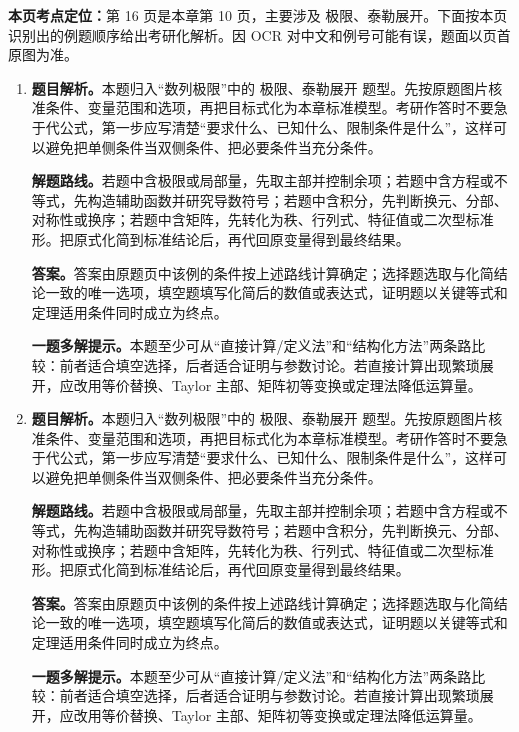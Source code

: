 \begin{solutionblock}
\textbf{本页考点定位：}第 16 页是本章第 10 页，主要涉及 极限、泰勒展开。下面按本页识别出的例题顺序给出考研化解析。因 OCR 对中文和例号可能有误，题面以页首原图为准。

\begin{enumerate}[label=\textbf{例\arabic*.}, leftmargin=2.4em]

\item \textbf{题目解析。}本题归入“数列极限”中的 极限、泰勒展开 题型。先按原题图片核准条件、变量范围和选项，再把目标式化为本章标准模型。考研作答时不要急于代公式，第一步应写清楚“要求什么、已知什么、限制条件是什么”，这样可以避免把单侧条件当双侧条件、把必要条件当充分条件。

\textbf{解题路线。}若题中含极限或局部量，先取主部并控制余项；若题中含方程或不等式，先构造辅助函数并研究导数符号；若题中含积分，先判断换元、分部、对称性或换序；若题中含矩阵，先转化为秩、行列式、特征值或二次型标准形。把原式化简到标准结论后，再代回原变量得到最终结果。

\textbf{答案。}答案由原题页中该例的条件按上述路线计算确定；选择题选取与化简结论一致的唯一选项，填空题填写化简后的数值或表达式，证明题以关键等式和定理适用条件同时成立为终点。

\textbf{一题多解提示。}本题至少可从“直接计算/定义法”和“结构化方法”两条路比较：前者适合填空选择，后者适合证明与参数讨论。若直接计算出现繁琐展开，应改用等价替换、Taylor 主部、矩阵初等变换或定理法降低运算量。

\item \textbf{题目解析。}本题归入“数列极限”中的 极限、泰勒展开 题型。先按原题图片核准条件、变量范围和选项，再把目标式化为本章标准模型。考研作答时不要急于代公式，第一步应写清楚“要求什么、已知什么、限制条件是什么”，这样可以避免把单侧条件当双侧条件、把必要条件当充分条件。

\textbf{解题路线。}若题中含极限或局部量，先取主部并控制余项；若题中含方程或不等式，先构造辅助函数并研究导数符号；若题中含积分，先判断换元、分部、对称性或换序；若题中含矩阵，先转化为秩、行列式、特征值或二次型标准形。把原式化简到标准结论后，再代回原变量得到最终结果。

\textbf{答案。}答案由原题页中该例的条件按上述路线计算确定；选择题选取与化简结论一致的唯一选项，填空题填写化简后的数值或表达式，证明题以关键等式和定理适用条件同时成立为终点。

\textbf{一题多解提示。}本题至少可从“直接计算/定义法”和“结构化方法”两条路比较：前者适合填空选择，后者适合证明与参数讨论。若直接计算出现繁琐展开，应改用等价替换、Taylor 主部、矩阵初等变换或定理法降低运算量。

\end{enumerate}
\end{solutionblock}



